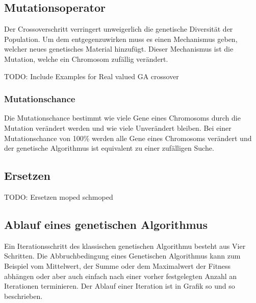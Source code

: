 \subsection{Mutationsoperator}
Der Crossoverschritt verringert unweigerlich die genetische Diversität der Population.
Um dem entgegenzuwirken muss es einen Mechanismus geben, welcher neues genetisches Material 
hinzufügt. Dieser Mechanismus ist die Mutation, welche ein Chromosom zufällig verändert.


TODO: Include Examples for Real valued GA crossover 

\subsubsection*{Mutationschance}
Die Mutationschance bestimmt wie viele Gene eines Chromosoms durch die Mutation verändert werden und wie viele
Unverändert bleiben. Bei einer Mutationschance von 100\% werden alle Gene eines Chromosoms verändert 
und der genetische Algorithmus ist equivalent zu einer zufälligen Suche.~\cite*{TerminologiesAndOperators}

\subsection{Ersetzen}
TODO: Ersetzen moped schmoped

\subsection{Ablauf eines genetischen Algorithmus}

Ein Iterationsschritt des klassischen genetischen Algorithmu besteht aus 
Vier Schritten. Die Abbruchbedingung eines Genetischen Algorithmus kann zum Beispiel 
vom Mittelwert, der Summe oder dem Maximalwert der Fitness abhängen oder aber auch einfach 
nach einer vorher festgelegten Anzahl an Iterationen terminieren.
Der Ablauf einer Iteration ist in Grafik so und so beschrieben.

